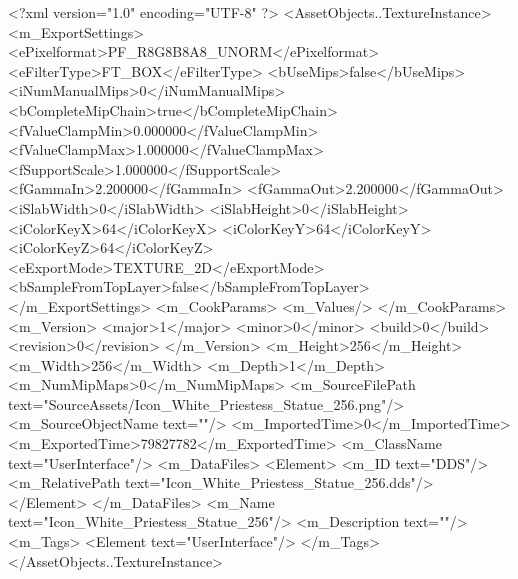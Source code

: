 <?xml version="1.0" encoding="UTF-8" ?>
<AssetObjects..TextureInstance>
	<m_ExportSettings>
		<ePixelformat>PF_R8G8B8A8_UNORM</ePixelformat>
		<eFilterType>FT_BOX</eFilterType>
		<bUseMips>false</bUseMips>
		<iNumManualMips>0</iNumManualMips>
		<bCompleteMipChain>true</bCompleteMipChain>
		<fValueClampMin>0.000000</fValueClampMin>
		<fValueClampMax>1.000000</fValueClampMax>
		<fSupportScale>1.000000</fSupportScale>
		<fGammaIn>2.200000</fGammaIn>
		<fGammaOut>2.200000</fGammaOut>
		<iSlabWidth>0</iSlabWidth>
		<iSlabHeight>0</iSlabHeight>
		<iColorKeyX>64</iColorKeyX>
		<iColorKeyY>64</iColorKeyY>
		<iColorKeyZ>64</iColorKeyZ>
		<eExportMode>TEXTURE_2D</eExportMode>
		<bSampleFromTopLayer>false</bSampleFromTopLayer>
	</m_ExportSettings>
	<m_CookParams>
		<m_Values/>
	</m_CookParams>
	<m_Version>
		<major>1</major>
		<minor>0</minor>
		<build>0</build>
		<revision>0</revision>
	</m_Version>
	<m_Height>256</m_Height>
	<m_Width>256</m_Width>
	<m_Depth>1</m_Depth>
	<m_NumMipMaps>0</m_NumMipMaps>
	<m_SourceFilePath text="SourceAssets/Icon_White_Priestess_Statue_256.png"/>
	<m_SourceObjectName text=""/>
	<m_ImportedTime>0</m_ImportedTime>
	<m_ExportedTime>79827782</m_ExportedTime>
	<m_ClassName text="UserInterface"/>
	<m_DataFiles>
		<Element>
			<m_ID text="DDS"/>
			<m_RelativePath text="Icon_White_Priestess_Statue_256.dds"/>
		</Element>
	</m_DataFiles>
	<m_Name text="Icon_White_Priestess_Statue_256"/>
	<m_Description text=""/>
	<m_Tags>
		<Element text="UserInterface"/>
	</m_Tags>
</AssetObjects..TextureInstance>
